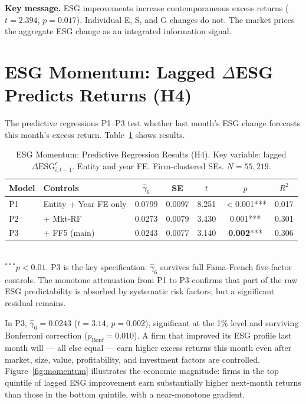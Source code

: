 \noindent\textbf{Key message.} ESG improvements increase contemporaneous excess returns ($t=2.394$, $p=0.017$). Individual E, S, and G changes do not. The market prices the aggregate ESG change as an integrated information signal.

\section[Lagged ESG Change Predicts Returns (H4)]{ESG Momentum: Lagged $\Delta$ESG Predicts Returns (H4)}
\label{sec:momentum}

The predictive regressions P1--P3 test whether last month's ESG change forecasts this month's excess return. Table~\ref{tab:pred} shows results.

\begin{table}[H]
  \centering
  \caption{ESG Momentum: Predictive Regression Results (H4). Key variable: lagged $\Delta\mathrm{ESG}_{i,t-1}^c$. Entity and year FE. Firm-clustered SEs. $N=55{,}219$.}
  \label{tab:pred}
  \begin{tabular}{llccccc}
    \toprule
    Model & Controls & $\hat{\gamma}_6$ & SE & $t$ & $p$ & $R^2$ \\
    \midrule
    P1 & Entity + Year FE only & 0.0799 & 0.0097 & 8.251 & $<$0.001*** & 0.017 \\
    P2 & $+$ Mkt-RF            & 0.0273 & 0.0079 & 3.430 & 0.001***    & 0.301 \\
    P3 & $+$ FF5 (main)        & 0.0243 & 0.0077 & 3.140 & \textbf{0.002}*** & 0.306 \\
    \bottomrule
  \end{tabular}
  \smallskip\\
  \footnotesize $^{***}p<0.01$. P3 is the key specification: $\hat{\gamma}_6$ survives full Fama-French five-factor controls. The monotone attenuation from P1 to P3 confirms that part of the raw ESG predictability is absorbed by systematic risk factors, but a significant residual remains.
\end{table}

In P3, $\hat{\gamma}_6 = 0.0243$ ($t = 3.14$, $p = 0.002$), significant at the 1\% level and surviving Bonferroni correction ($p_{\text{Bonf}} = 0.010$). A firm that improved its ESG profile last month will --- all else equal --- earn higher excess returns this month even after market, size, value, profitability, and investment factors are controlled. Figure~\ref{fig:momentum} illustrates the economic magnitude: firms in the top quintile of lagged ESG improvement earn substantially higher next-month returns than those in the bottom quintile, with a near-monotone gradient.

